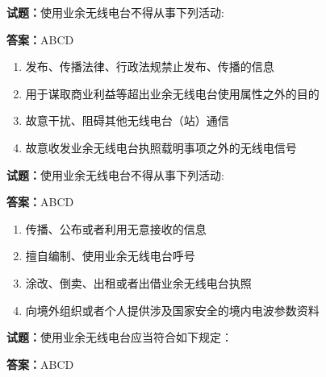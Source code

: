 \documentclass{ctexbook}
\begin{document}




\vspace{1em}

\textbf{试题：}使用业余无线电台不得从事下列活动: 

\textbf{答案：}ABCD 

\begin{enumerate}[leftmargin=3em]
  \item 发布、传播法律、行政法规禁止发布、传播的信息 

  \item 用于谋取商业利益等超出业余无线电台使用属性之外的目的 

  \item 故意干扰、阻碍其他无线电台（站）通信 

  \item 故意收发业余无线电台执照载明事项之外的无线电信号 

\end{enumerate}





\vspace{1em}

\textbf{试题：}使用业余无线电台不得从事下列活动: 

\textbf{答案：}ABCD 


\begin{enumerate}[leftmargin=3em]
  \item 传播、公布或者利用无意接收的信息 

  \item 擅自编制、使用业余无线电台呼号 

  \item 涂改、倒卖、出租或者出借业余无线电台执照 

  \item 向境外组织或者个人提供涉及国家安全的境内电波参数资料 

\end{enumerate}





\vspace{1em}

\textbf{试题：}使用业余无线电台应当符合如下规定： 

\textbf{答案：}ABCD 
\end{document}
